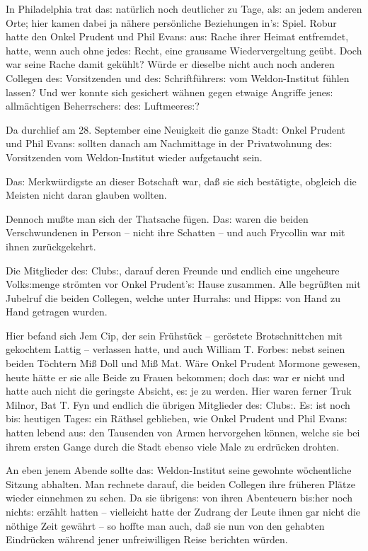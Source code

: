 \documentclass[oneside,12pt]{book}
\newcommand{\s}{s:}
\begin{document}
In Philadelphia trat da{\s} nat\"urlich noch deutlicher zu Tage,
al{\s} an jedem anderen Orte; hier kamen dabei ja n\"ahere
pers\"onliche Beziehungen in'{\s} Spiel. Robur hatte den Onkel
Prudent und Phil Evan{\s} au{\s} Rache ihrer Heimat entfremdet,
hatte, wenn auch ohne jede{\s} Recht, eine grausame Wiedervergeltung
ge\"ubt. Doch war seine Rache damit gek\"uhlt? W\"urde er dieselbe
nicht auch noch anderen Collegen de{\s} Vorsitzenden und de{\s}
Schriftf\"uhrer{\s} vom Weldon-Institut f\"uhlen lassen? Und wer
konnte sich gesichert w\"ahnen gegen etwaige Angriffe jene{\s}
allm\"achtigen Beherrscher{\s} de{\s} Luftmeere{\s}?

Da durchlief am 28. September eine Neuigkeit die ganze Stadt: Onkel
Prudent und Phil Evan{\s} sollten danach am Nachmittage in der
Privatwohnung de{\s} Vorsitzenden vom Weldon-Institut wieder
aufgetaucht sein.

Da{\s} Merkw\"urdigste an dieser Botschaft war, da{\ss} sie sich
best\"atigte, obgleich die Meisten nicht daran glauben wollten.

Dennoch mu{\ss}te man sich der Thatsache f\"ugen. Da{\s} waren die
beiden Verschwundenen in Person -- nicht ihre Schatten -- und auch
Frycollin war mit ihnen zur\"uckgekehrt.

Die Mitglieder de{\s} Club{\s}, darauf deren Freunde und endlich eine
ungeheure Volk{\s}menge str\"omten vor Onkel Prudent'{\s} Hause
zusammen. Alle begr\"u{\ss}ten mit Jubelruf die beiden Collegen,
welche unter Hurrah{\s} und Hipp{\s} von Hand zu Hand getragen
wurden.

Hier befand sich Jem Cip, der sein Fr\"uhst\"uck -- ger\"ostete
Brotschnittchen mit gekochtem Lattig -- verlassen hatte, und auch
William T. Forbe{\s} nebst seinen beiden T\"ochtern Mi{\ss} Doll und
Mi{\ss} Mat. W\"are Onkel Prudent Mormone gewesen, heute h\"atte er
sie alle Beide zu Frauen bekommen; doch da{\s} war er nicht und hatte
auch nicht die geringste Absicht, e{\s} je zu werden. Hier waren
ferner Truk Milnor, Bat T. Fyn und endlich die \"ubrigen Mitglieder
de{\s} Club{\s}. E{\s} ist noch bi{\s} heutigen Tage{\s} ein
R\"athsel geblieben, wie Onkel Prudent und Phil Evan{\s} hatten
lebend au{\s} den Tausenden von Armen hervorgehen k\"onnen, welche
sie bei ihrem ersten Gange durch die Stadt ebenso viele Male zu
erdr\"ucken drohten.

An eben jenem Abende sollte da{\s} Weldon-Institut seine gewohnte
w\"ochentliche Sitzung abhalten. Man rechnete darauf, die beiden
Collegen ihre fr\"uheren Pl\"atze wieder einnehmen zu sehen. Da sie
\"ubrigen{\s} von ihren Abenteuern bi{\s}her noch nicht{\s} erz\"ahlt
hatten -- vielleicht hatte der Zudrang der Leute ihnen gar nicht die
n\"othige Zeit gew\"ahrt -- so hoffte man auch, da{\ss} sie nun von
den gehabten Eindr\"ucken w\"ahrend jener unfreiwilligen Reise
berichten w\"urden.
\end{document}
